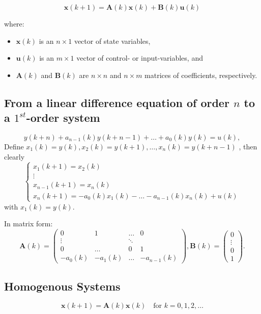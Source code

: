 \[
    \mathbf{x}(k + 1) = \mathbf{A}(k)\mathbf{x}(k) + \mathbf{B}(k)\mathbf{u}(k)
\]

where: \begin{itemize}
    \item \(\mathbf{x}(k)\) is an \(n \times 1\) vector of state variables,
    \item \(\mathbf{u}(k)\) is an \(m \times 1\) vector of control- or input-variables, and
    \item \(\mathbf{A}(k)\) and \(\mathbf{B}(k)\) are \(n \times n\) and \(n \times m\) matrices of coefficients, respectively.
\end{itemize}


\subsection{From a linear difference equation of order \(n\) to a \(1^{st}\)-order system}

\[
    y(k + n) + a_{n - 1}(k)y(k + n - 1) + \dots + a_{0}(k)y(k) = u(k),
\]
Define
\(x_{1}(k) = y(k), x_{2}(k) = y(k + 1), \ldots , x_{n}(k) = y(k + n - 1)\)
, then clearly
\[
    \left\{ \begin{array}{c} x_{1}(k + 1) = x_{2}(k) \\ \vdots \\ x_{n - 1}(k + 1) = x_{n}(k) \\ x_{n}(k + 1) = -a_{0}(k)x_{1}(k) - \dots - a_{n - 1}(k)x_{n}(k) + u(k) \end{array} \right.
\]
with \(x_{1}(k) = y(k)\).

In matrix form:
\[
    \mathbf{A}(k) = \left( \begin{array}{cccc}0 & 1 & \dots & 0 \\ \vdots & & \ddots & \\ 0 & \dots & 0 & 1 \\ -a_{0}(k) & -a_{1}(k) & \dots & -a_{n - 1}(k) \end{array} \right), \mathbf{B}(k) = \left( \begin{array}{c}0 \\ \vdots \\ 0 \\ 1 \end{array} \right).
\]

\subsection{Homogenous Systems}

\[
    \mathbf{x}(k + 1) = \mathbf{A}(k)\mathbf{x}(k) \quad \text{for } k = 0,1,2, \ldots
\]

